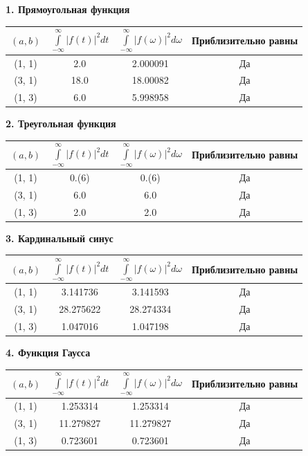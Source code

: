 \documentclass[a4paper,12pt]{article}
\begin{document}
\textbf{1. Прямоугольная функция}\\
\begin{center}
\begin{tabular}{|c|c|c|c|}
    \hline
     $(a, b)$& $\int\limits_{-\infty}^{\infty} |f(t)|^2 dt$ & $\int\limits_{-\infty}^{\infty}|f(\omega)|^2d\omega$ & Приблизительно равны\\
     \hline
      (1, 1)& 2.0 & 2.000091 & Да \\
      \hline
      (3, 1)& 18.0 & 18.00082& Да \\
      \hline
        (1, 3)& 6.0 & 5.998958 & Да\\
        \hline
\end{tabular}
\end{center}
\newpage
\textbf{2. Треугольная функция}\\
\begin{center}
\begin{tabular}{|c|c|c|c|}
    \hline
     $(a, b)$& $\int\limits_{-\infty}^{\infty} |f(t)|^2 dt$ & $\int\limits_{-\infty}^{\infty}|f(\omega)|^2d\omega$ & Приблизительно равны\\
     \hline
      \hline
      (1, 1)& 0.(6) & 0.(6) & Да \\
      \hline
      (3, 1)& 6.0& 6.0& Да \\
      \hline
        (1, 3)& 2.0& 2.0 & Да\\
        \hline

\end{tabular}
\end{center}


\textbf{3. Кардинальный синус}\\
\begin{center}
\begin{tabular}{|c|c|c|c|}
    \hline
     $(a, b)$& $\int\limits_{-\infty}^{\infty} |f(t)|^2 dt$ & $\int\limits_{-\infty}^{\infty}|f(\omega)|^2d\omega$ & Приблизительно равны\\
     \hline
      (1, 1)& 3.141736 & 3.141593& Да \\
      \hline
      (3, 1)&28.275622 & 28.274334& Да \\
      \hline
        (1, 3)& 1.047016& 1.047198 & Да\\
        \hline

\end{tabular}
\end{center}
\textbf{4. Функция Гаусса}\\
\begin{center}
\begin{tabular}{|c|c|c|c|}
    \hline
    $(a, b)$& $\int\limits_{-\infty}^{\infty} |f(t)|^2 dt$ & $\int\limits_{-\infty}^{\infty}|f(\omega)|^2d\omega$ & Приблизительно равны\\
    \hline
    (1, 1)& 1.253314 & 1.253314 & Да \\
      \hline
      (3, 1)&11.279827 &11.279827 & Да \\
      \hline
        (1, 3)&0.723601 & 0.723601 & Да\\
        \hline

\end{tabular}
\end{center}
\end{document}
